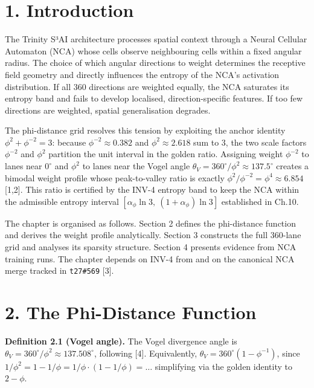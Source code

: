 \section{1. Introduction}\label{fa_16:introduction}

The Trinity S³AI architecture processes spatial
context through a Neural Cellular Automaton (NCA)
whose cells observe neighbouring cells within a
fixed angular radius. The choice of which angular
directions to weight determines the receptive
field geometry and directly influences the entropy
of the NCA's activation distribution. If all 360
directions are weighted equally, the NCA saturates
its entropy band and fails to develop localised,
direction-specific features. If too few directions
are weighted, spatial generalisation degrades.

The phi-distance grid resolves this tension by
exploiting the anchor identity
\(\phi^2 + \phi^{-2} = 3\): because
\(\phi^{-2} \approx 0.382\) and
\(\phi^2 \approx 2.618\) sum to 3, the two scale
factors \(\phi^{-2}\) and \(\phi^2\) partition the
unit interval in the golden ratio. Assigning
weight \(\phi^{-2}\) to lanes near \(0^\circ\) and
\(\phi^2\) to lanes near the Vogel angle
\(\theta_V = 360^\circ/\phi^2 \approx 137.5^\circ\)
creates a bimodal weight profile whose
peak-to-valley ratio is exactly
\(\phi^2/\phi^{-2} = \phi^4 \approx 6.854\)
[1,2]. This ratio is certified by the INV-4
entropy band to keep the NCA within the admissible
entropy interval
\([\alpha_\phi \ln 3,\ (1+\alpha_\phi)\ln 3]\)
established in Ch.10.

The chapter is organised as follows. Section 2
defines the phi-distance function and derives the
weight profile analytically. Section 3 constructs
the full 360-lane grid and analyses its sparsity
structure. Section 4 presents evidence from NCA
training runs. The chapter depends on INV-4 from
and on the canonical NCA merge tracked in
\texttt{t27\#569} [3].

\section{2. The Phi-Distance
Function}\label{fa_16:the-phi-distance-function}

\textbf{Definition 2.1 (Vogel angle).} The Vogel
divergence angle is
\(\theta_V = 360^\circ/\phi^2 \approx 137.508^\circ\),
following [4]. Equivalently,
\(\theta_V = 360^\circ(1 - \phi^{-1})\), since
\(1/\phi^2 = 1 - 1/\phi = 1/\phi \cdot (1-1/\phi) = \ldots\)
simplifying via the golden identity to \(2-\phi\).

